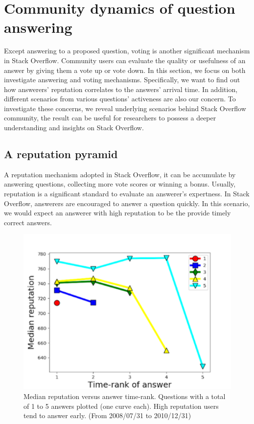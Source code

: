 \section{Community dynamics of question answering}
Except answering to a proposed question, voting is another significant mechanism in Stack Overflow. Community users can evaluate the quality or usefulness of an answer by giving them a vote up or vote down. In this section, we focus on both investigate answering and voting mechanisms. Specifically, we want to find out how answerers' reputation correlates to the answers' arrival time. In addition, different scenarios from various questions' activeness are also our concern. To investigate these concerns, we reveal underlying scenarios behind Stack Overflow community, the result can be useful for researchers to possess a deeper understanding and insights on Stack Overflow. 

\subsection{A reputation pyramid}
A reputation mechanism adopted in Stack Overflow, it can be accumulate by answering questions, collecting more vote scores or winning a bonus. Usually, reputation is a significant standard to evaluate an answerer's expertness. In Stack Overflow, answerers are encouraged to answer a question quickly. In this scenario, we would expect an answerer with high reputation to be the provide timely correct answers. 

\begin{figure}[!t]
    \centering
    \includegraphics[width=0.7\columnwidth]{img/Fig1_2010.pdf}
    \caption{Median reputation versus answer time-rank. Questions with a total of 1 to 5 answers plotted (one curve each). High reputation users tend to answer early. (From 2008/07/31 to 2010/12/31)}
    \label{fig:fig1_2010}
\end{figure}

